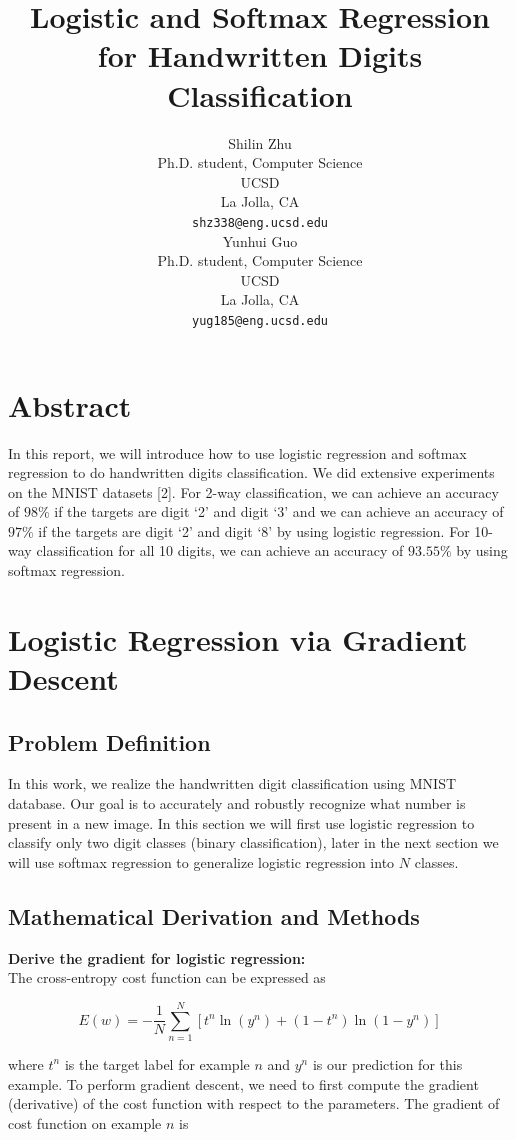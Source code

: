 \documentclass{article} %
\title{Logistic and Softmax Regression for Handwritten Digits Classification}
\author{
Shilin Zhu \\
Ph.D. student, Computer Science\\
UCSD\\
La Jolla, CA \\
\texttt{shz338@eng.ucsd.edu} \\
\And
Yunhui Guo\\
Ph.D. student, Computer Science\\
UCSD\\
La Jolla, CA \\
\texttt{yug185@eng.ucsd.edu} \\
}
\begin{document}
\maketitle

\section{Abstract}
In this report, we will introduce how to use logistic regression and softmax regression to do handwritten digits classification. We did extensive experiments on the MNIST datasets [2]. For 2-way classification, we can achieve an accuracy of $98\%$ if the targets are digit `2' and digit `3' and we can achieve an accuracy of $97\%$ if the targets are digit `2' and digit `8' by using logistic regression. For 10-way classification for all 10 digits, we can achieve an accuracy  of $93.55\%$ by using softmax regression.

\section{Logistic Regression via Gradient Descent}

\subsection{Problem Definition}
In this work, we realize the handwritten digit classification using MNIST database. Our goal is to accurately and robustly recognize what number is present in a new image. In this section we will first use logistic regression to classify only two digit classes (binary classification), later in the next section we will use softmax regression to generalize logistic regression into $N$ classes.

\subsection{Mathematical Derivation and Methods}
\textbf{Derive the gradient for logistic regression:} \\
The cross-entropy cost function can be expressed as

\begin{equation}
	E(w) = - \frac{1}{N}\sum_{n=1}^{N}[t^{n}\ln(y^{n})+(1-t^{n})\ln(1-y^{n})]
\end{equation}

where $t^{n}$ is the target label for example $n$ and $y^{n}$ is our prediction for this example. To perform gradient descent, we need to first compute the gradient (derivative) of the cost function with respect to the parameters. The gradient of cost function on example $n$ is
\end{document}

